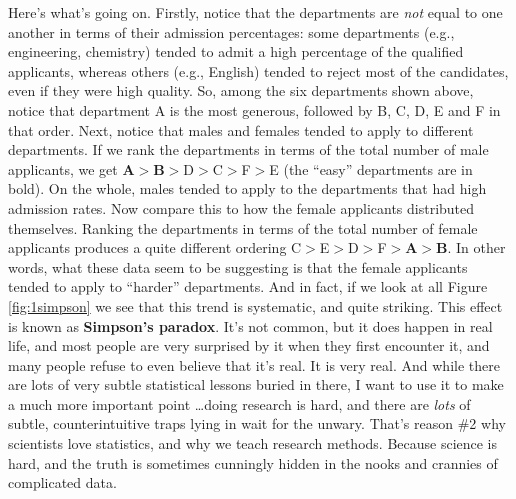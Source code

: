 \documentclass[
]{book}
\begin{document}
Here's what's going on. Firstly, notice that the departments are \emph{not} equal to one another in terms of their admission percentages: some departments (e.g., engineering, chemistry) tended to admit a high percentage of the qualified applicants, whereas others (e.g., English) tended to reject most of the candidates, even if they were high quality. So, among the six departments shown above, notice that department A is the most generous, followed by B, C, D, E and F in that order. Next, notice that males and females tended to apply to different departments. If we rank the departments in terms of the total number of male applicants, we get \textbf{A}\(>\)\textbf{B}\(>\)D\(>\)C\(>\)F\(>\)E (the ``easy'' departments are in bold). On the whole, males tended to apply to the departments that had high admission rates. Now compare this to how the female applicants distributed themselves. Ranking the departments in terms of the total number of female applicants produces a quite different ordering C\(>\)E\(>\)D\(>\)F\(>\)\textbf{A}\(>\)\textbf{B}. In other words, what these data seem to be suggesting is that the female applicants tended to apply to ``harder'' departments. And in fact, if we look at all Figure \ref{fig:1simpson} we see that this trend is systematic, and quite striking. This effect is known as \textbf{Simpson's paradox}. It's not common, but it does happen in real life, and most people are very surprised by it when they first encounter it, and many people refuse to even believe that it's real. It is very real. And while there are lots of very subtle statistical lessons buried in there, I want to use it to make a much more important point \ldots doing research is hard, and there are \emph{lots} of subtle, counterintuitive traps lying in wait for the unwary. That's reason \#2 why scientists love statistics, and why we teach research methods. Because science is hard, and the truth is sometimes cunningly hidden in the nooks and crannies of complicated data.
\end{document}
